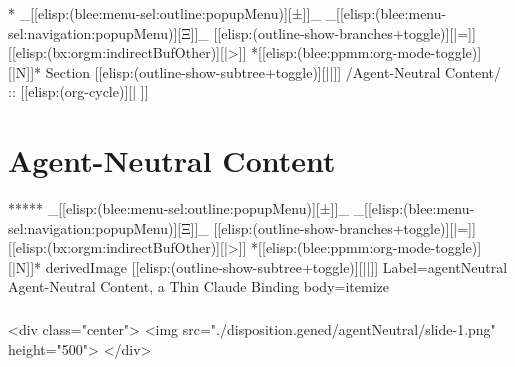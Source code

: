 \begin{whenOrg}
\begin{verblatex}
\begin{frame}[fragile,plain,label=vscodeClaudeLayers]

\end{frame}
\end{verblatex}



\begin{whenOrg}
*  _[[elisp:(blee:menu-sel:outline:popupMenu)][±]]_ _[[elisp:(blee:menu-sel:navigation:popupMenu)][Ξ]]_ [[elisp:(outline-show-branches+toggle)][|=]] [[elisp:(bx:orgm:indirectBufOther)][|>]] *[[elisp:(blee:ppmm:org-mode-toggle)][|N]]*  Section    [[elisp:(outline-show-subtree+toggle)][||]]   /Agent-Neutral Content/ ::  [[elisp:(org-cycle)][| ]]
\end{whenOrg}

\section{Agent-Neutral Content}

\begin{whenOrg}
*****  _[[elisp:(blee:menu-sel:outline:popupMenu)][±]]_ _[[elisp:(blee:menu-sel:navigation:popupMenu)][Ξ]]_ [[elisp:(outline-show-branches+toggle)][|=]] [[elisp:(bx:orgm:indirectBufOther)][|>]] *[[elisp:(blee:ppmm:org-mode-toggle)][|N]]*  derivedImage [[elisp:(outline-show-subtree+toggle)][||]] Label=agentNeutral Agent-Neutral Content, a Thin Claude Binding body=itemize
\end{whenOrg}

\begin{htmlonly}

\begin{frame}[fragile,plain,label=agentNeutral]
    \frametitle{}
    \framesubtitle{}
    \begin{rawhtml}
<div class="center">
<img src="./disposition.gened/agentNeutral/slide-1.png" height="500">
</div>
    \end{rawhtml}
\end{frame}
\end{htmlonly}


\end{whenOrg}
